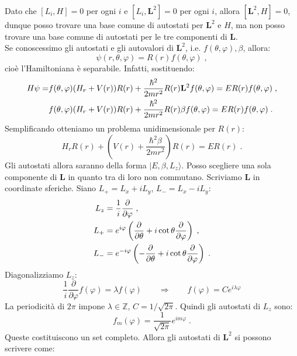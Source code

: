 \documentclass[12pt,a4paper]{report}
\theoremstyle{definition}
\numberwithin{equation}{section}
\newcommand{\ket}{\rangle}
\begin{document}
Dato che $[L_i,H]=0$ per ogni $i$ e $[L_i,\mathbf{L}^2]=0$ per ogni $i$, allora $[\mathbf{L}^2,H]=0$, dunque posso trovare  una base comune di autostati per $\mathbf{L}^2$ e $H$, ma non posso trovare una base comune di autostati per le tre componenti di $\mathbf{L}$. \\
Se conoscessimo gli autostati e gli autovalori di $\mathbf{L}^2$, i.e. $f(\theta,\varphi),\beta$, allora:
\begin{equation}
\psi(r,\theta,\varphi)=R(r)f(\theta,\varphi)\;,
\end{equation}
cioè l'Hamiltoniana è separabile. Infatti, sostituendo:
\begin{align}
H\psi= &f(\theta,\varphi)(H_r+V(r))R(r)+\frac{\hbar^2}{2mr^2}R(r)\mathbf{L}^2f(\theta,\varphi)=ER(r)f(\theta,\varphi)\;, \notag \\
&f(\theta,\varphi)(H_r+V(r))R(r)+\frac{\hbar^2}{2mr^2}R(r)\beta f(\theta,\varphi)=ER(r)f(\theta,\varphi)\;.
\end{align}
Semplificando otteniamo un problema unidimensionale per $R(r)$:
\begin{equation}
H_rR(r)+\left(V(r)+\frac{\hbar^2\beta}{2mr^2}\right)R(r)=ER(r)\;.
\end{equation}
Gli autostati allora saranno della forma $|E,\beta,L_z\ket$. Posso scegliere una sola componente di $\mathbf{L}$ in quanto tra di loro non commutano. Scriviamo $\mathbf{L}$ in coordinate sferiche. Siano $L_+=L_x+iL_y$, $L_-=L_x-iL_y$:
\begin{align}
L_z &= \frac{1}{i}\frac{\partial}{\partial\varphi}\;, \notag \\
L_+ &= e^{i\varphi}\left(\frac{\partial}{\partial\theta}+i\cot\theta\frac{\partial}{\partial\varphi}\right)\;, \notag \\
L_- &= e^{-i\varphi}\left(-\frac{\partial}{\partial\theta}+i\cot\theta\frac{\partial}{\partial\varphi}\right)\;. \label{ch7_lrappschro}
\end{align}
Diagonalizziamo $L_z$:
\begin{equation}
\frac{1}{i}\frac{\partial}{\partial\varphi}f(\varphi)=\lambda f(\varphi)\qquad \Longrightarrow \qquad f(\varphi)=C e^{i\lambda\varphi}
\end{equation}
La periodicità di $2\pi$ impone $\lambda\in\mathbb{Z}$, $C=1/\sqrt{2\pi}$. Quindi gli autostati di $L_z$ sono:
\begin{equation}
f_m(\varphi)=\frac{1}{\sqrt{2\pi}}e^{im\varphi}\;.
\end{equation}
Queste costituiscono un set completo. Allora gli autostati di $\mathbf{L}^2$ si possono scrivere come:
\end{document}
